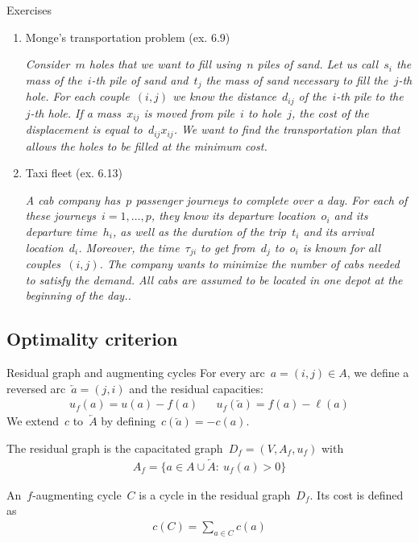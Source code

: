 \documentclass{beamer}
\begin{document}
\begin{frame}{Exercises} \pause
  \begin{enumerate}
    \item Monge's transportation problem (ex. 6.9)
    
    \textit{\tiny Consider~$m$ holes that we want to fill using~$n$ piles of sand. Let us call~$s_i$ the mass of the~$i$-th pile of sand and~$t_j$ the mass of sand necessary to fill the~$j$-th hole. For each couple~$(i,j)$ we know the distance~$d_{ij}$ of the~$i$-th pile to the~$j$-th hole. If a mass~$x_{ij}$ is moved from pile~$i$ to hole~$j$, the cost of the displacement is equal to~$d_{ij}x_{ij}$. We want to find the transportation plan that allows the holes to be filled at the minimum cost.}
     \pause
    
    \item Taxi fleet (ex. 6.13)
    
    \textit{\tiny A cab company has~$p$ passenger journeys to complete over a day. For each of these journeys~$i=1,\ldots,p$, they know its departure location~$o_i$ and its departure time~$h_i$, as well as the duration of the trip~$t_i$ and its arrival location~$d_i$. Moreover, the time~$\tau_{ji}$ to get from~$d_j$ to~$o_i$ is known for all couples~$(i,j)$. The company wants to minimize the number of cabs needed to satisfy the demand. All cabs are assumed to be located in one depot at the beginning of the day..}
  \end{enumerate}
\end{frame}

\subsection{Optimality criterion}

\begin{frame}[t]{Residual graph and augmenting cycles} \pause
  For every arc~$a = (i, j) \in A$, we define a reversed arc~$\overleftarrow{a} = (j, i)$ and the residual capacities:
  \begin{align*}
    u_f(a) = u(a) - f(a) && u_f\left(\overleftarrow{a}\right) = f(a) - \ell(a)
  \end{align*} \pause
  We extend~$c$ to~$\overleftarrow{A}$ by defining~$c\left(\overleftarrow{a}\right) = - c(a)$.

\medskip \pause

  The residual graph is the capacitated graph~$D_f = (V, A_f, u_f)$ with
  \begin{align*}
    A_f = \{a \in A \cup \overleftarrow{A}:~ u_f(a) > 0\} 
  \end{align*} \pause
  
  An~$f$-augmenting cycle~$C$ is a cycle in the residual graph~$D_f$. Its cost is defined as
  \begin{align*}
    c(C) = \sum_{a \in C} c(a)
  \end{align*}
\end{frame}
\end{document}
